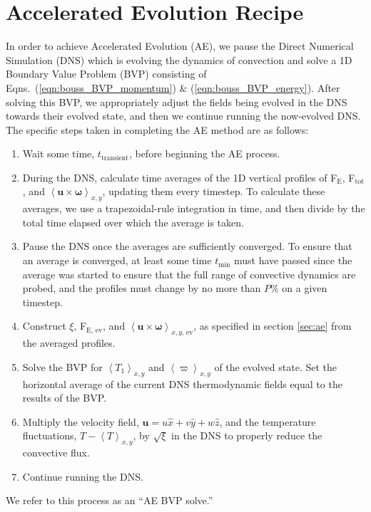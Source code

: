 \documentclass[aps, pre, onecolumn, nofootinbib, notitlepage, groupedaddress, amsfonts, amssymb, amsmath, longbibliography]{revtex4-1}
\newcommand{\angles}[1]{\ensuremath{\left\langle #1 \right\rangle}}
\begin{document}
\newpage
\section{Accelerated Evolution Recipe}
\label{appendix:recipe}
In order to achieve Accelerated Evolution (AE), we pause the Direct Numerical Simulation (DNS)
which is evolving the dynamics of convection and solve a 1D Boundary Value Problem (BVP)
consisting of Eqns.~(\ref{eqn:bouss_BVP_momentum}) \& (\ref{eqn:bouss_BVP_energy}).
After solving this BVP, we appropriately adjust the fields being evolved in the DNS
towards their evolved state, and then we continue running the now-evolved DNS.
The specific steps taken in completing the AE method are as follows:
\begin{enumerate}
\item Wait some time, $t_{\text{transient}}$, before beginning the AE process.
\item During the DNS, calculate time averages of the 1D vertical profiles of
F$_{\text{E}}$, F$_{\text{tot}}$, 
and $\angles{\bm{u} \times \bm{\omega}}_{x,y}$, updating them every timestep.  
To calculate these
averages, we use a trapezoidal-rule integration in time, and then divide by the
total time elapsed over which the average is taken. 
\item Pause the DNS once the averages are sufficiently converged. 
To ensure that an average is converged, at
least some time $t_{\text{min}}$ must have passed since the average was started to
ensure that the full range of convective dynamics are probed, and
the profiles must change by no more than $P$\% on a given timestep.
\item Construct $\xi$, F$_{\text{E, ev}}$, and $\angles{\bm{u} \times \bm{\omega}}_{x,y\text{, ev}}$,
as specified in section \ref{sec:ae}
from the averaged profiles.
\item Solve the BVP for $\angles{T_1}_{x,y}$ and $\angles{\varpi}_{x,y}$ of the
evolved state.  Set the horizontal average of the current DNS thermodynamic fields
equal to the results of the BVP.
\item Multiply the velocity field, $\bm{u} = u\hat{x} + v\hat{y} + w\hat{z}$,
and the temperature fluctuations, $T - \angles{T}_{x,y}$,
by $\sqrt{\xi}$ in the DNS to properly reduce the convective flux.
\item Continue running the DNS.
\end{enumerate}
We refer to this process as an ``AE BVP solve.''
\end{document}
